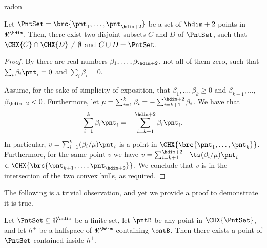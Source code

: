 \begin{fragment}{radon}
\begin{theorem}
    Let $\PntSet = \brc{\pnt_1, \ldots, \pnt_{\hdim+2}}$ be a set of
    $\hdim+2$ points in $\Re^\hdim$. Then, there exist two disjoint
    subsets $C$ and $D$ of $\PntSet$, such that $\CHX{C} \cap \CHX{D}
    \ne \emptyset$ and $C \cup D = \PntSet$. %
\end{theorem}
\end{fragment}
\begin{proof}
    By  there are real numbers $\beta_1, \ldots,
    \beta_{\hdim+2}$, not all of them zero, such that $\sum_i \beta_i
    \pnt_i = 0$ and $\sum_i \beta_i = 0$.
    
    Assume, for the sake of simplicity of exposition, that $\beta_1, 
    \ldots, \beta_k \geq 0$ and $\beta_{k+1}, \ldots$,
    $\beta_{\hdim+2} < 0$.  Furthermore, let $\mu = \sum_{i=1}^{k}
    \beta_i = -\sum_{i=k+1}^{\hdim+2} \beta_i$.  We have that
    \begin{equation*}
        \sum_{i=1}^{k} \beta_i \pnt_i = - \sum_{i=k+1}^{\hdim+2} \beta_i
        \pnt_i.        
    \end{equation*}
    In particular, $v = \sum_{i=1}^{k} (\beta_i/\mu) \pnt_i$ is a
    point in $\CHX{\brc{\pnt_1,\ldots, \pnt_k}}$. Furthermore, for the
    same point $v$ we have
    $v = \sum_{i=k+1}^{\hdim+2} - \ts(\beta_i/\mu) \pnt_i$
    $ \in \CHX{\brc{\pnt_{k+1}, \ldots, \pnt_{\hdim+2}}}$. We conclude
    that $v$ is in the intersection of the two convex hulls, as
    required.
\end{proof}


The following is a trivial observation, and yet we provide a proof to
demonstrate it is true.

\begin{lemma}
    Let $\PntSet \subseteq \Re^\hdim$ be a finite set, let $\pntB$ be
    any point in $\CHX{\PntSet}$, and let $h^+$ be a halfspace of
    $\Re^\hdim$ containing $\pntB$. Then there exists a point of
    $\PntSet$ contained inside $h^+$.
\end{lemma}

